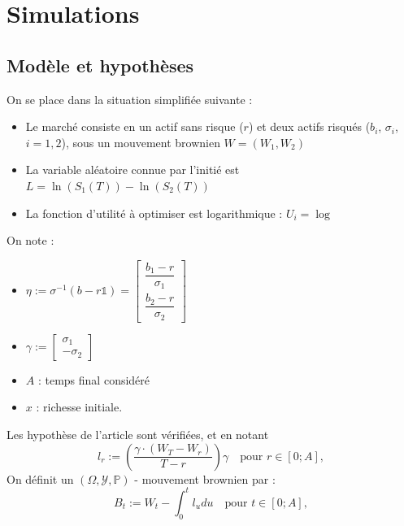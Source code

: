 \documentclass[french]{beamer}
\begin{document}
\section{Simulations}
\subsection{Modèle et hypothèses}
\begin{frame}
On se place dans la situation simplifiée suivante : 
\begin{itemize}
	\item Le marché consiste en un actif sans risque ($r$) et deux actifs risqués ($b_{i}$, $\sigma_{i}$, $i = 1, 2$), sous un mouvement brownien $W = \left( W_{1}, W_{2} \right)$
	\item La variable aléatoire connue par l'initié est $L = \ln\left(S_{1} \left(T \right) \right) - \ln\left( S_{2} \left( T \right) \right)$
	\item La fonction d'utilité à optimiser est logarithmique : $U_{i} = \log$
\end{itemize}
\end{frame}

\begin{frame}
On note : 
\begin{itemize}
	\item $\eta := \sigma^{-1} \left( b - r \mathds{1} \right) = \begin{bmatrix} \dfrac{b_{1} - r}{\sigma_{1}} \\ \dfrac{b_{2} - r}{\sigma_{2}} \end{bmatrix}$
	\item $\gamma := \begin{bmatrix} \sigma_{1} \\ - \sigma_{2} \end{bmatrix}$
	\item $A$ : temps final considéré
	\item $x$ : richesse initiale.
\end{itemize}
\end{frame}

\begin{frame}
Les hypothèse de l'article sont vérifiées, et en notant 
\begin{displaymath}
	l_{r} := \left( \dfrac{\gamma\cdot \left( W_{T} - W_{r} \right)}{T - r} \right) \gamma \quad \text{pour } r \in \left[ 0; A\right],
\end{displaymath}
On définit un $\left( \Omega, \mathcal{Y}, \mathbb{P} \right)$ - mouvement brownien par :
\begin{displaymath}
	B_{t} := W_{t} - \int_{0}^{t} l_{u} du \quad \text{pour } t \in \left[ 0; A\right],
\end{displaymath}
\end{frame}
\end{document}
